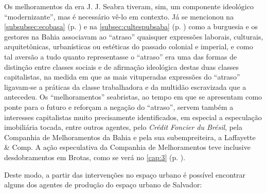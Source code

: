 Os melhoramentos da era J. J. Seabra tiveram, sim, um componente ideológico ``modernizante'', mas é necessário vê-lo em contexto. Já se mencionou na \autoref{subsubsec:ecobasa} (p. \pageref{subsubsec:ecobasa}) e na \autoref{subsec:cultespubsaba} (p. \pageref{subsec:cultespubsaba}) como a burguesia e os gestores na Bahia associavam ao ``atraso'' quaisquer expressões laborais, culturais, arquitetônicas, urbanísticas ou estéticas do passado colonial e imperial, e como tal aversão a tudo quanto representasse o ``atraso'' era uma das formas de distinção entre classes sociais e de afirmação ideológica destas duas classes capitalistas, na medida em que as mais vituperadas expressões do ``atraso'' ligavam-se a práticas da classe trabalhadora e da multidão escravizada que a antecedeu. Os ``melhoramentos'' seabristas, ao tempo em que se apresentam como ponte para o futuro e reforçam a negação do ``atraso'', servem também a interesses capitalistas muito precisamente identificados, em especial a especulação imobiliária tocada, entre outros agentes, pelo \textit{Crédit Foncier du Brésil}, pela Companhia de Melhoramentos da Bahia e pela sua subempreiteira, a Laffayette \& Comp. A ação especulativa da Companhia de Melhoramentos teve inclusive desdobramentos em Brotas, como se verá no \autoref{cap:3} (p. \pageref{cap:3}).

Deste modo, a partir das intervenções no espaço urbano é possível encontrar alguns dos agentes de produção do espaço urbano de Salvador:

